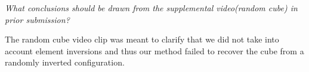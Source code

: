 \emph{What conclusions should be drawn from the supplemental video(random cube) in prior submission?}

The random cube video clip was meant to clarify that we did not take into account element inversions and thus our method failed to recover the cube from a randomly inverted configuration.


%





